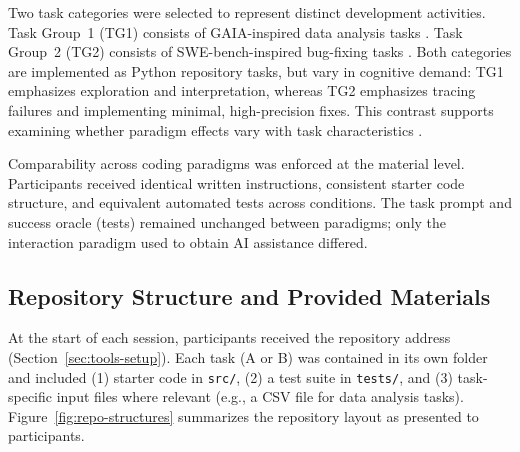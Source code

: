 Two task categories were selected to represent distinct development activities. Task Group~1 (TG1) consists of GAIA-inspired data analysis tasks \parencite[p.~4]{gaiaBenchmark}. Task Group~2 (TG2) consists of SWE-bench-inspired bug-fixing tasks \parencite[p.~3--8]{sweBenchmark}. Both categories are implemented as Python repository tasks, but vary in cognitive demand: TG1 emphasizes exploration and interpretation, whereas TG2 emphasizes tracing failures and implementing minimal, high-precision fixes. This contrast supports examining whether paradigm effects vary with task characteristics \parencite{sarkar2025codewithme,barke2023trust}.

Comparability across coding paradigms was enforced at the material level. Participants received identical written instructions, consistent starter code structure, and equivalent automated tests across conditions. The task prompt and success oracle (tests) remained unchanged between paradigms; only the interaction paradigm used to obtain AI assistance differed.

\subsection{Repository Structure and Provided Materials}

At the start of each session, participants received the repository address (Section~\ref{sec:tools-setup}). Each task (A or B) was contained in its own folder and included (1) starter code in \texttt{src/}, (2) a test suite in \texttt{tests/}, and (3) task-specific input files where relevant (e.g., a CSV file for data analysis tasks). Figure~\ref{fig:repo-structures} summarizes the repository layout as presented to participants.

